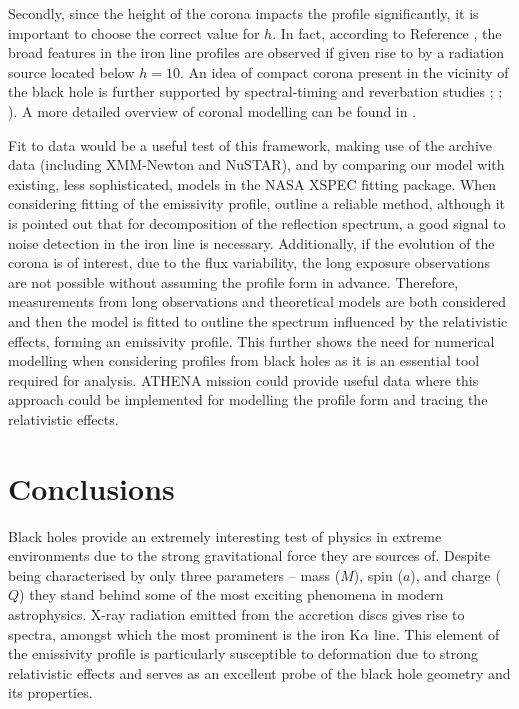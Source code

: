 \documentclass[fleqn,usenatbib,useAMS]{mnras}
\begin{document}
Secondly, since the height of the corona impacts the profile significantly, it is important to choose the correct value for $h$. In fact, according to Reference \cite{fabian2014determination}, the broad features in the iron line profiles are observed if given rise to by a radiation source located below $h=10$. An idea of compact corona present in the vicinity of the black hole is further supported by spectral-timing and reverbation studies \cite{cackett2014modelling}; \cite{kara2013discovery}; \cite{uttley2014x}). A more detailed overview of coronal modelling can be found in \cite{dauser2016relativistic}.

Fit to data would be a useful test of this framework, making use of the archive data (including XMM-Newton and NuSTAR), and by comparing our model with existing, less sophisticated, models in the NASA XSPEC fitting package. 
When considering fitting of the emissivity profile, \cite{wilkins2015driving} outline a reliable method, although it is pointed out that for decomposition of the reflection spectrum, a good signal to noise detection in the iron line is necessary. Additionally, if the evolution of the corona is of interest, due to the flux variability, the long exposure observations are not possible without assuming the profile form in advance. Therefore, measurements from long observations and theoretical models are both considered and then the model is fitted to outline the spectrum influenced by the relativistic effects, forming an emissivity profile. This further shows the need for numerical modelling when considering profiles from black holes as it is an essential tool required for analysis. 
ATHENA mission could provide useful data where this approach could be implemented for modelling the profile form and tracing the relativistic effects.


\section{Conclusions}

Black holes provide an extremely interesting test of physics in extreme environments due to the strong gravitational force they are sources of. Despite being characterised by only three parameters -- mass ($M$), spin ($a$), and charge ($Q$) they stand behind some of the most exciting phenomena in modern astrophysics. X-ray radiation emitted from the accretion discs gives rise to spectra, amongst which the most prominent is the iron K$\alpha$ line. This element of the emissivity profile is particularly susceptible to deformation due to strong relativistic effects and serves as an excellent probe of the black hole geometry and its properties.
\end{document}
